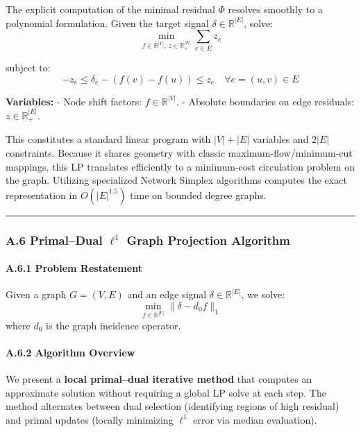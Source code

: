 \documentclass[
]{article}
\begin{document}
The explicit computation of the minimal residual \(\Phi\) resolves
smoothly to a polynomial formulation. Given the target signal
\(\delta \in \mathbb{R}^{|E|}\), solve:
\[ \min_{f \in \mathbb{R}^{|V|}, \, z \in \mathbb{R}^{|E|}_+} \sum_{e \in E} z_e \]

subject to:
\[ -z_e \leq \delta_e - (f(v) - f(u)) \leq z_e \quad \forall e=(u,v) \in E \]

\textbf{Variables:} - Node shift factors: \(f \in \mathbb{R}^{|V|}\). -
Absolute boundaries on edge residuals: \(z \in \mathbb{R}^{|E|}_+\).

This constitutes a standard linear program with \(|V| + |E|\) variables
and \(2|E|\) constraints. Because it shares geometry with classic
maximum-flow/minimum-cut mappings, this LP translates efficiently to a
minimum-cost circulation problem on the graph. Utilizing specialized
Network Simplex algorithms computes the exact representation in
\(O(|E|^{1.5})\) time on bounded degree graphs.

\begin{center}\rule{0.5\linewidth}{0.5pt}\end{center}

\subsubsection{\texorpdfstring{A.6 Primal--Dual \(\ell^1\) Graph
Projection
Algorithm}{A.6 Primal--Dual \textbackslash ell\^{}1 Graph Projection Algorithm}}\label{a.6-primaldual-ell1-graph-projection-algorithm}

\paragraph{A.6.1 Problem Restatement}\label{a.6.1-problem-restatement}

Given a graph \(G = (V, E)\) and an edge signal
\(\delta \in \mathbb{R}^{|E|}\), we solve:
\[ \min_{f \in \mathbb{R}^{|V|}} \|\delta - d_0 f\|_1 \] where \(d_0\)
is the graph incidence operator.

\paragraph{A.6.2 Algorithm Overview}\label{a.6.2-algorithm-overview}

We present a \textbf{local primal--dual iterative method} that computes
an approximate solution without requiring a global LP solve at each
step. The method alternates between dual selection (identifying regions
of high residual) and primal updates (locally minimizing \(\ell^1\)
error via median evaluation).
\end{document}
